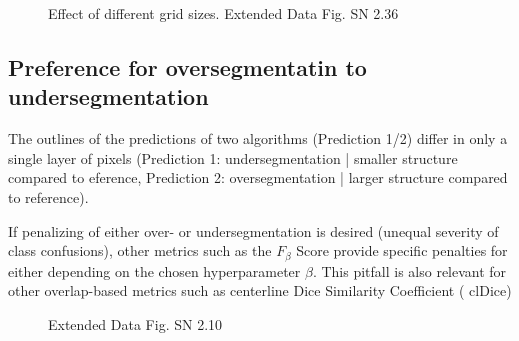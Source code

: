 \documentclass[11pt]{article}
\begin{document}
\begin{figure}[H]
    \centering
    \caption{Effect of different grid sizes. Extended Data Fig. SN 2.36~\cite{pitfalls-in-segmentation-evaluation}}
\end{figure}

\subsection{Preference for oversegmentatin to undersegmentation}

The outlines of the predictions of two algorithms (Prediction 1/2) differ in only a single layer of pixels (Prediction 1: undersegmentation | smaller structure compared to eference, Prediction 2: oversegmentation | larger structure compared to reference).

If penalizing of either over- or undersegmentation is desired (unequal severity of class confusions), other metrics such as the $F_\beta$ Score provide specific penalties for either depending on the chosen hyperparameter $\beta$. This pitfall is also relevant for other overlap-based metrics such as centerline Dice Similarity Coefficient ( clDice)

\begin{figure}[H]
    \centering
    \caption{Extended Data Fig. SN 2.10~\cite{pitfalls-in-segmentation-evaluation}}
\end{figure}

\printbibliography
{}
\end{document}
